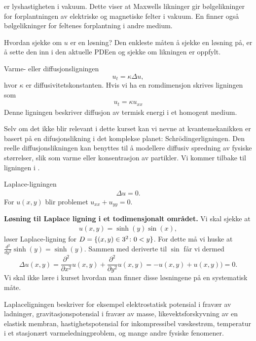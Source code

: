 \noindent er lyshastigheten i vakuum. Dette viser at Maxwells likninger gir bølgelikninger for forplantningen av elektriske og magnetiske felter i vakuum. En finner også bølgelikninger for feltenes forplantning i andre medium.

\begin{oppsum}{Hvordan sjekke om $u$ er en løsning?}
Den enkleste måten å sjekke en løsning på, er å sette den inn i den aktuelle PDEen og sjekke om likningen er oppfylt.
\end{oppsum}



\begin{eks}{Varme- eller diffusjonsligningen}
\[
u_t =\kappa \Delta u,
\]
hvor \( \kappa \) er diffusivitetskonstanten. Hvis vi ha en romdimensjon skrives ligningen som
\begin{align}\label{eq:diffeq}
u_t = \kappa u_{xx}\end{align}
Denne ligningen beskriver diffusjon av termisk energi i et homogent medium. 
\end{eks}
Selv om det ikke blir relevant i dette kurset kan vi nevne at kvantemekanikken er basert på en difusjonslikning i det komplekse planet: Schrödingerligningen.
Den reelle diffusjonslikningen kan benyttes til å modellere diffusiv spredning av fysiske størrelser, slik som varme eller konsentrasjon av partikler. Vi kommer tilbake til ligningen i .

\begin{eks}{Laplace-ligningen}
\begin{align}\label{eq:Laplace}
\Delta u = 0. 
\end{align}
For $u(x,y)$ blir problemet $u_{xx}+u_{yy}=0$.

\textbf{Løsning til Laplace ligning i et todimensjonalt området.} Vi skal sjekke at 
\begin{align}\label{Laplace:loes}
u(x,y)=\sinh (y)\sin(x),\end{align}
løser Laplace-ligning for $D=\{(x,y) \in 3^2 \colon 0< y\}$.
For dette må vi huske at $\frac{d^2}{dy^2} \sinh (y)=\sinh(y)$. Sammen med deriverte til $\sin$ får vi dermed
\[\Delta u(x,y) = \frac{\partial^2}{\partial x^2}u(x,y)+\frac{\partial^2}{\partial y^2}u(x,y) = -u(x,y)+u(x,y))=0.\]
Vi skal ikke lære i kurset hvordan man finner disse løsningene på en systematisk måte.
\end{eks}
Laplaceligningen beskriver for eksempel elektrostatisk potensial i fravær av ladninger, gravitasjonspotensial i fravær av masse, likevektsforskyvning av en elastisk membran, hastighetspotensial for inkompressibel væskestrøm, temperatur i et stasjonært varmeledningproblem, og mange andre fysiske fenomener.

